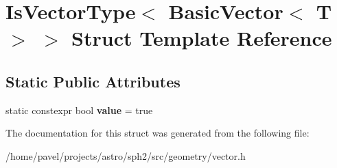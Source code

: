 \hypertarget{structIsVectorType_3_01BasicVector_3_01T_01_4_01_4}{}\section{Is\+Vector\+Type$<$ Basic\+Vector$<$ T $>$ $>$ Struct Template Reference}
\label{structIsVectorType_3_01BasicVector_3_01T_01_4_01_4}
\subsection*{Static Public Attributes}
\begin{DoxyCompactItemize}
\item 
\hypertarget{structIsVectorType_3_01BasicVector_3_01T_01_4_01_4_a7df80070d8e80465803010c069ed51e3}{}\label{structIsVectorType_3_01BasicVector_3_01T_01_4_01_4_a7df80070d8e80465803010c069ed51e3} 
static constexpr bool {\bfseries value} = true
\end{DoxyCompactItemize}


The documentation for this struct was generated from the following file\+:\begin{DoxyCompactItemize}
\item 
/home/pavel/projects/astro/sph2/src/geometry/vector.\+h\end{DoxyCompactItemize}
